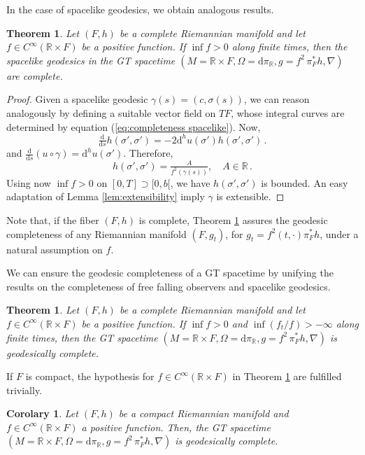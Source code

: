 \documentclass[12pt]{article}
\newcommand{\diff}{\mathrm{d}}
\newcommand{\ds}{\diff s}
\newcommand{\dd}[2][{}]{\frac{\!\diff#1}{\!\diff#2}}
\newcommand{\dds}{\dd{s}}
\newtheorem{theor}[defi]{Theorem}
\newtheorem{cor}[defi]{Corolary}
\def\R{\mathbb R}
\begin{document}
In the case of spacelike geodesics, we obtain analogous results.
\begin{theor}\label{theor:completeness spacelike}
    Let $(F,h)$ be a complete Riemannian manifold and let $f\in C^\infty(\R \times F)$ be a positive function. If $\inf f >0$ along finite times, then the spacelike geodesics in the GT spacetime $(M=\R\times F, \Omega =\diff \pi_\R, g=f^2\, \pi_F^* h, \nabla)$ are complete.
\end{theor}
\begin{proof}
    Given a spacelike geodesic $\gamma(s) = (c,\sigma(s))$, we can reason analogously by defining a suitable vector field on $TF$, whose integral curves are determined by equation (\ref{eq:completeness spacelike}). Now, 
    \[
        \tfrac{\diff}{\ds} h(\sigma', \sigma') = -2 \diff^h u(\sigma') h(\sigma', \sigma')\,.
    \]
    and $\dds (u\circ \gamma) = \diff^h u(\sigma')$. Therefore,
    \begin{equation}\label{eq:completeness spacelike hnorm}
        h(\sigma',\sigma') = \tfrac{A}{f^2 (\gamma(s))},\quad A\in \R\,.
    \end{equation}
    Using now $\inf f >0$ on $[0,T] \supset [0,b[$, we have $h(\sigma',\sigma')$ is bounded. An easy adaptation of Lemma \ref{lem:extensibility} imply $\gamma$ is extensible. 
\end{proof}

Note that, if the fiber $(F,h)$ is complete, Theorem \ref{theor:completeness spacelike} assures the geodesic completeness of any Riemannian manifold $(F, g_t)$, for $g_t = f^2(t,\cdot) \pi_F^* h$, under a natural assumption on $f$. 

We can ensure the geodesic completeness of a GT spacetime by unifying the results on the completeness of free falling observers and spacelike geodesics.
\begin{theor}\label{theor:completeness}
    Let $(F,h)$ be a complete Riemannian manifold and let $f\in C^\infty(\R \times F)$ be a positive function. If $\inf f >0$ and $\inf (f_t/f)>-\infty$ along finite times, then the GT spacetime $(M=\R\times F, \Omega =\diff \pi_\R, g=f^2\, \pi_F^* h, \nabla)$ is geodesically complete.
\end{theor}

If $F$ is compact, the hypothesis for $f\in C^\infty(\R \times F)$ in Theorem \ref{theor:completeness} are fulfilled trivially.
\begin{cor}\label{corollary:completeness compact}
    Let $(F,h)$ be a compact Riemannian manifold and $f\in C^\infty(\R \times F)$ a positive function. Then, the GT spacetime 
    $(M=\R\times F, \Omega =\diff \pi_\R, g=f^2\, \pi_F^* h, \nabla)$ is geodesically complete. 
\end{cor}
\end{document}
